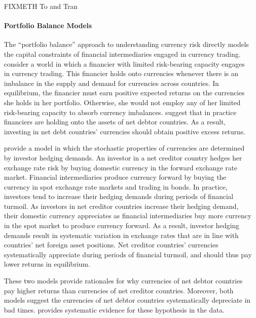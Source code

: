 \documentclass{ar-1col}
\begin{document}
FIXMETH To and Tran


\paragraph*{Portfolio Balance Models} The  ``portfolio balance'' approach to understanding currency risk directly models the capital constraints of financial intermediaries engaged in currency trading. \citet{GabaixMaggiori2015} consider a world in which a financier with limited risk-bearing capacity engages in currency trading. This financier holds onto currencies whenever there is an imbalance in the supply and demand for currencies across countries. In equilibrium, the financier must earn positive expected returns on the currencies she holds in her portfolio. Otherwise, she would not employ any of her limited risk-bearing capacity to absorb currency imbalances. \citet{GabaixMaggiori2015} suggest that in practice financiers are holding onto the assets of net debtor countries. As a result, investing in net debt countries' currencies should obtain positive excess returns. 

\citet{LiaoZhang2020} provide a model in which the stochastic properties of currencies are determined by investor hedging demands. An investor in a net creditor country hedges her exchange rate risk by buying domestic currency in the forward exchange rate market. Financial intermediaries produce currency forward by buying the currency in spot exchange rate markets and trading in bonds. In practice, investors tend to increase their hedging demands during periods of financial turmoil. As investors in net creditor countries increase their hedging demand, their domestic currency appreciates as financial intermediaries buy more currency in the spot market to produce currency forward. As a result, investor hedging demands result in systematic variation in exchange rates that are in line with countries' net foreign asset positions. Net creditor countries' currencies systematically appreciate during periods of financial turmoil, and should thus pay lower returns in equilibrium.

These two models provide rationales for why currencies of net debtor countries pay higher returns than currencies of net creditor countries. Moreover, both models suggest the currencies of net debtor countries systematically depreciate in bad times. \citet{DellaCorteetal2009} provides systematic evidence for these hypothesis in the data. 
 
\end{document}
